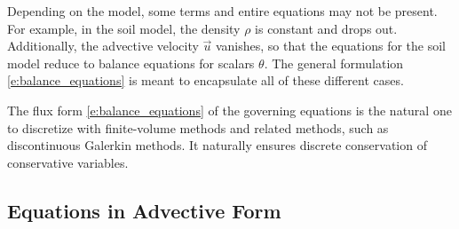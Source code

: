\documentclass{report}
\begin{document}
Depending on the model, some terms and entire equations may not be present. For example, in the soil model, the density $\rho$ is constant and drops out. Additionally, the advective velocity $\vec{u}$ vanishes, so that the equations for the soil model reduce to balance equations for scalars $\theta$. The general formulation \eqref{e:balance_equations} is meant to encapsulate all of these different cases.

The flux form \eqref{e:balance_equations} of the governing equations is the natural one to discretize with finite-volume methods and related methods, such as discontinuous Galerkin methods. It naturally ensures discrete conservation of conservative variables. 

\subsection{Equations in Advective Form}\label{s:advective_equations}
\end{document}

